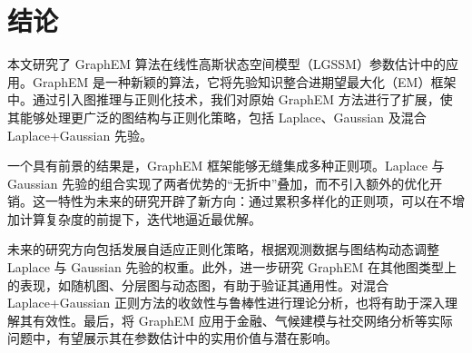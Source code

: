 
\chapter{结论}

本文研究了 GraphEM 算法在线性高斯状态空间模型（LGSSM）参数估计中的应用。GraphEM 是一种新颖的算法，它将先验知识整合进期望最大化（EM）框架中。通过引入图推理与正则化技术，我们对原始 GraphEM 方法进行了扩展，使其能够处理更广泛的图结构与正则化策略，包括 Laplace、Gaussian 及混合 Laplace+Gaussian 先验。

一个具有前景的结果是，GraphEM 框架能够无缝集成多种正则项。Laplace 与 Gaussian 先验的组合实现了两者优势的“无折中”叠加，而不引入额外的优化开销。这一特性为未来的研究开辟了新方向：通过累积多样化的正则项，可以在不增加计算复杂度的前提下，迭代地逼近最优解。


未来的研究方向包括发展自适应正则化策略，根据观测数据与图结构动态调整 Laplace 与 Gaussian 先验的权重。此外，进一步研究 GraphEM 在其他图类型上的表现，如随机图、分层图与动态图，有助于验证其通用性。对混合 Laplace+Gaussian 正则方法的收敛性与鲁棒性进行理论分析，也将有助于深入理解其有效性。最后，将 GraphEM 应用于金融、气候建模与社交网络分析等实际问题中，有望展示其在参数估计中的实用价值与潜在影响。
